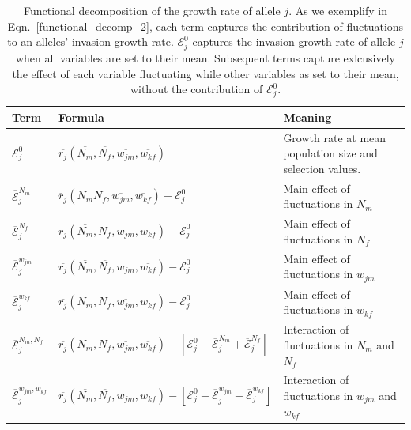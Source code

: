 \begin{table}[h]
\fontsize{7}{12}\selectfont %
    \centering
      \caption{Functional decomposition of the growth rate of allele $j$. As we exemplify in Eqn.~\ref{functional_decomp_2}, each term captures the contribution of fluctuations to an alleles' invasion growth rate.  $\mathcal{E}^{0}_{j}$ captures the invasion growth rate of allele $j$ when all variables are set to their mean. Subsequent terms capture exlcusively the effect of each variable fluctuating while other variables as set to their mean, without the contribution of $\mathcal{E}^{0}_{j}$. }
  \resizebox{\textwidth}{!} {\begin{tabular}{l|l|l}
  \toprule
        Term & Formula & Meaning \\
        \hline
         $\mathcal{E}^{0}_{j}$ & $\overline{r_{j}} (\overline{N_{m}}, \overline{N_{f}}, \overline{w_{jm}}, \overline{w_{kf}})$ & Growth rate at mean population size and selection values. \\


         $\overline{\mathcal{E}}^{N_{m}}_{j}$ & $\overline{r}_{j}(N_{m} \overline{N_{f}}, \overline{w_{jm}}, \overline{w_{kf}}) - \mathcal{E}^{0}_{j} $ & Main effect of fluctuations in $N_{m}$\\

         $\overline{\mathcal{E}}^{N_{f}}_{j}$ & $ \overline{r_{j}}( \overline{N_{m}}, N_{f},\overline{w_{jm}}, \overline{w_{kf}}) - \mathcal{E}^{0}_{j}$ & Main effect of fluctuations in $N_{f}$ \\

        $\overline{\mathcal{E}}^{w_{jm}}_{j}$ & $ \overline{r_{j}}(\overline{N_{m}}, \overline{N_{f}}, w_{jm}, \overline{w_{kf}}) - \mathcal{E}^{0}_{j}$& Main effect of fluctuations in $w_{jm}$\\

        $\overline{\mathcal{E}}^{w_{kf}}_{j}$ & $ \overline{r_{j}}(\overline{N_{m}}, \overline{N_{f}}, \overline{w_{jm}}, w_{kf})- \mathcal{E}^{0}_{j}$ & Main effect of fluctuations in $w_{kf}$\\

        $\overline{\mathcal{E}}^{N_{m},N_{f}}_{j}$ & $ \overline{r_{j}}(N_{m}, N_{f}, \overline{w_{jm}}, \overline{w_{kf}})- [\mathcal{E}^{0}_{j} +\overline{\mathcal{E}}^{N_{m}}_{j}+\overline{\mathcal{E}}^{N_{f}}_{j}]$ & Interaction of fluctuations in $N_{m}$ and $N_{f}$\\

        $\overline{\mathcal{E}}^{w_{jm},w_{kf}}_{j}$ & $ \overline{r_{j}}(\overline{N_{m}}, \overline{N_{f}}, w_{jm}, w_{kf})- [\mathcal{E}^{0}_{j} +\overline{\mathcal{E}}^{w_{jm}}_j+\overline{\mathcal{E}}^{w_{kf}}_{j}]$ & Interaction of fluctuations in $w_{jm}$ and $w_{kf}$ \\


\end{tabular}}
\end{table}
